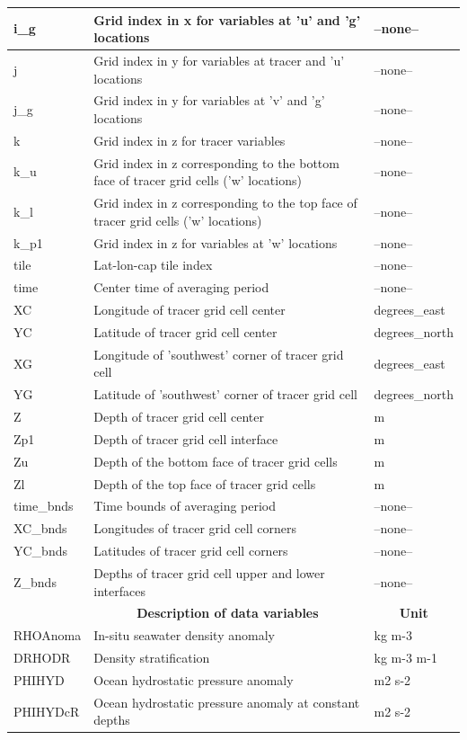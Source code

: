 \begin{longtable}{|m{}|m{}|m{}|}
i\_g &Grid index in x for variables at 'u' and 'g' locations &--none--  \\ \hline
j &Grid index in y for variables at tracer and 'u' locations &--none--  \\ \hline
j\_g &Grid index in y for variables at 'v' and 'g' locations &--none--  \\ \hline
k &Grid index in z for tracer variables &--none--  \\ \hline
k\_u &Grid index in z corresponding to the bottom face of tracer grid cells ('w' locations) &--none--  \\ \hline
k\_l &Grid index in z corresponding to the top face of tracer grid cells ('w' locations) &--none--  \\ \hline
k\_p1 &Grid index in z for variables at 'w' locations &--none--  \\ \hline
tile &Lat-lon-cap tile index &--none--  \\ \hline
time &Center time of averaging period &--none--  \\ \hline
XC &Longitude of tracer grid cell center &degrees\_east  \\ \hline
YC &Latitude of tracer grid cell center &degrees\_north  \\ \hline
XG &Longitude of 'southwest' corner of tracer grid cell &degrees\_east  \\ \hline
YG &Latitude of 'southwest' corner of tracer grid cell &degrees\_north  \\ \hline
Z &Depth of tracer grid cell center &m  \\ \hline
Zp1 &Depth of tracer grid cell interface &m  \\ \hline
Zu &Depth of the bottom face of tracer grid cells &m  \\ \hline
Zl &Depth of the top face of tracer grid cells &m  \\ \hline
time\_bnds &Time bounds of averaging period &--none--  \\ \hline
XC\_bnds &Longitudes of tracer grid cell corners &--none--  \\ \hline
YC\_bnds &Latitudes of tracer grid cell corners &--none--  \\ \hline
Z\_bnds &Depths of tracer grid cell upper and lower interfaces &--none--  \\ \hline
\rowcolor{lightgray} \multicolumn{1}{|c|}{\textbf{Variables}} & \multicolumn{1}{|c|}{\textbf{Description of data variables}} &  \multicolumn{1}{|c|}{\textbf{Unit}}\\ \hline
RHOAnoma &In-situ seawater density anomaly &kg m-3  \\ \hline
DRHODR &Density stratification &kg m-3 m-1  \\ \hline
PHIHYD &Ocean hydrostatic pressure anomaly &m2 s-2  \\ \hline
PHIHYDcR &Ocean hydrostatic pressure anomaly at constant depths &m2 s-2  \\ \hline
\end{longtable}

